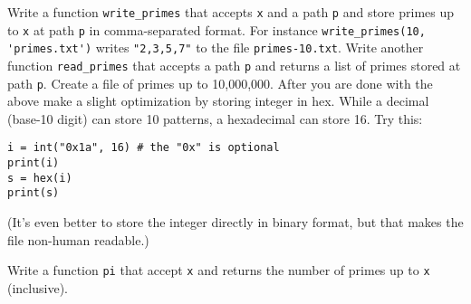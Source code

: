 \begin{ex}
  Write a function \verb!write_primes! that accepts \verb!x! and a path \verb!p!
  and store primes up to \verb!x! at path \verb!p! in comma-separated format.
  For instance \verb!write_primes(10, 'primes.txt')!
  writes \verb!"2,3,5,7"! to the file \verb!primes-10.txt!.
  Write another function \verb!read_primes! that accepts a path \verb!p!
  and returns a list of primes stored at path \verb!p!.
  Create a file of primes up to 10,000,000.
  After you are done with the above make a slight optimization by storing
  integer in hex.
  While a decimal (base-10 digit) can store 10 patterns,
  a hexadecimal can store 16.
  Try this:
  \begin{Verbatim}[frame=single,fontsize=\footnotesize]
i = int("0x1a", 16) # the "0x" is optional
print(i)
s = hex(i)
print(s)
  \end{Verbatim}
  (It's even better to store the integer directly in binary format, but
  that makes the file non-human readable.)
\end{ex}

\begin{ex}
  Write a function \verb!pi! that accept \verb!x! and returns
  the number of primes up to \verb!x! (inclusive).
\end{ex}


